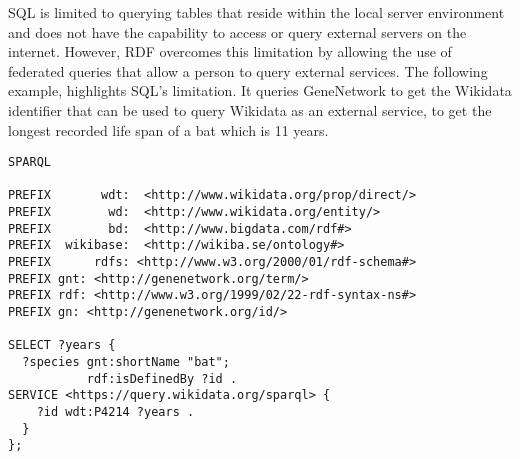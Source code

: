 SQL is limited to querying tables that reside within the local server environment and does not have the capability to access or query external servers on the internet.  However, RDF overcomes this limitation by allowing the use of federated queries that allow a person to query external services.  The following example, highlights SQL's limitation.  It queries GeneNetwork to get the Wikidata identifier that can be used to query Wikidata as an external service, to get the longest recorded life span of a bat which is 11 years.

\begin{Verbatim}[frame=single]
SPARQL

PREFIX       wdt:  <http://www.wikidata.org/prop/direct/>
PREFIX        wd:  <http://www.wikidata.org/entity/>
PREFIX        bd:  <http://www.bigdata.com/rdf#>
PREFIX  wikibase:  <http://wikiba.se/ontology#>
PREFIX      rdfs: <http://www.w3.org/2000/01/rdf-schema#>
PREFIX gnt: <http://genenetwork.org/term/>
PREFIX rdf: <http://www.w3.org/1999/02/22-rdf-syntax-ns#>
PREFIX gn: <http://genenetwork.org/id/>

SELECT ?years {
  ?species gnt:shortName "bat";
           rdf:isDefinedBy ?id .
SERVICE <https://query.wikidata.org/sparql> {
    ?id wdt:P4214 ?years .
  }
};
\end{Verbatim}

